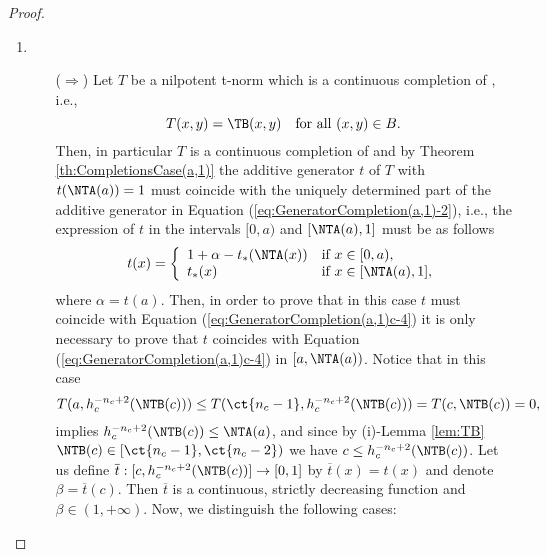 \begin{proof}
\begin{enumerate}[label=(\roman*)]
\begin{itemize}
\begin{itemize}
\begin{itemize}
					\item  If $h_c^{-n}(x) \in (h_c^{-n_c+2}(a),\NTA(a))$ then
					$$ t(x) = nt(c)+ t(h_c^{-n}(x)) = n\beta+ \overline{t}(h_c^{-n}(x)).$$
					\item  If $h_c^{-n}(x) \in [c,h_c^{-n_c+2}(a)]$ then by Equation (\ref{eq:c3-1})
					$$ t(x) = nt(c)+ t(h_c^{-n}(x)) = n\beta+ 1 + \gamma -t_*(\NTA(h_c^{n_c-n-2}(x))).$$
				\end{itemize}
			\end{itemize}
			Then, by Equations (\ref{eq:alpha:c3}) and (\ref{eq:beta:c3}) we obtain
			$$\alpha=t(a) = (n_c-2)\beta+ \overline{t}(h_c^{-n_c+2}(a)),$$
			and we have proved that $t$ is given by Equation (\ref{eq:GeneratorCompletion(a,1)c-3}).
			\item[($\Leftarrow$)] Similar to the proof of Case (ii).
		\end{itemize}
		\item ~~
		\begin{itemize}
			\item[($\Rightarrow$)]  Let $T$ be a nilpotent t-norm which is a continuous completion of \TB, i.e.,
			$$T(x,y)=\TB(x,y) \quad \text{for all } (x,y) \in B.$$
			Then, in particular $T$ is a continuous completion of \TA and by Theorem \ref{th:CompletionsCase(a,1)} the additive generator $t$ of $T$ with $t(\NTA(a))=1$ must coincide with the uniquely determined part of the additive generator in Equation (\ref{eq:GeneratorCompletion(a,1)-2}), i.e., the expression of $t$ in the intervals $[0,a)$ and $[\NTA(a),1]$ must be as follows
			$$
			t(x)
			=
			\left\{ \begin{array}{ll}
				1+\alpha-t_{*}(\NTA(x)) & \text{if } x \in [0,a), \\
				t_{*}(x) & \text{if } x \in [\NTA(a),1],
			\end{array} \right.
			$$
			where $\alpha=t(a)$. Then, in order to prove that in this case $t$ must coincide with Equation (\ref{eq:GeneratorCompletion(a,1)c-4}) it is only necessary to prove that $t$ coincides with Equation (\ref{eq:GeneratorCompletion(a,1)c-4}) in $[a,\NTA(a))$. Notice that in this case
			$$T(a,h_c^{-n_c+2}(\NTB(c))) \leq T(\ct{n_c-1},h_c^{-n_c+2}(\NTB(c))) = T(c,\NTB(c))=0,$$
			implies $h_c^{-n_c+2}(\NTB(c)) \leq \NTA(a)$, and since by (i)-Lemma \ref{lem:TB} \linebreak $\NTB(c) \in [\ct{n_c-1},\ct{n_c-2})$ we have $c\leq h_c^{-n_c+2}(\NTB(c))$.  Let us define $\overline{t}: [c,h_c^{-n_c+2}(\NTB(c))] \to [0,1]$ by $\overline{t}(x)=t(x)$ and denote $\beta=\overline{t}(c)$. Then $\overline{t}$ is a continuous, strictly decreasing function and $\beta \in (1,+\infty)$. Now, we distinguish the following cases:

\end{itemize}
\end{enumerate}
\end{proof}
